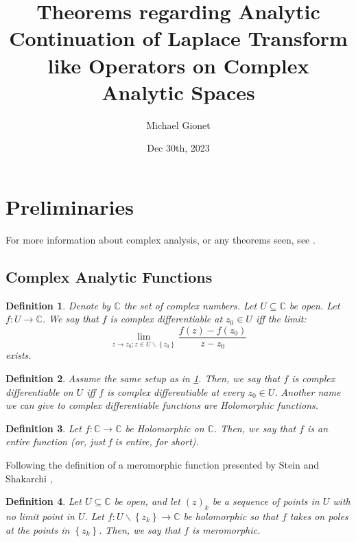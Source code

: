 \documentclass{article}
\title{Theorems regarding Analytic Continuation of Laplace Transform like Operators on Complex Analytic Spaces}
\author{Michael Gionet}
\date{Dec 30th, 2023}
\newtheorem{definition}{Definition}
\begin{document}
	\maketitle
	
	\section{Preliminaries}
	
	For more information about complex analysis, or any theorems seen, see \cite{steinComplexAnalysis}.
	
	\subsection{Complex Analytic Functions}
	
	\begin{definition} \label{def_complex_diff_point}
		Denote by $\mathbb{C}$ the set of complex numbers. 
		Let $ U \subseteq \mathbb{C} $ be open. 
		Let $ f : U \rightarrow \mathbb{C} $. 
		We say that $f$ is complex differentiable at $z_0 \in U$ iff the limit:
		$$ \lim_{ z \rightarrow z_0; z \in U \backslash \left\{ z_0 \right\} } \frac{ f(z) - f(z_0) }{ z - z_0 } $$
		exists. 
	\end{definition}

	\begin{definition} \label{ def_complex_diff_domain }
		Assume the same setup as in \ref{def_complex_diff_point}. Then, we say that $f$ is complex differentiable on $U$ iff $f$ is complex differentiable at every $z_0 \in U$. Another name we can give to complex differentiable functions are Holomorphic functions. 
	\end{definition}

	\begin{definition} \label{ def_entire_function }
		Let $f : \mathbb{C} \rightarrow \mathbb{C}$ be Holomorphic on $\mathbb{C}$. Then, we say that $f$ is an entire function (or, just f is entire, for short).
	\end{definition}

	Following the definition of a meromorphic function presented by Stein and Shakarchi \cite{steinComplexAnalysis},
	\begin{definition} \label{ def_meromorphic }
		Let $U \subseteq \mathbb{C}$ be open, and let $(z)_k$ be a sequence of points in $U$ with no limit point in $U$. 
		Let $f : U \backslash \left\{z_k \right\} \rightarrow \mathbb{C} $ be holomorphic so that $f$ takes on poles at the points in $\left\{ z_k \right\}$. Then, we say that $f$ is meromorphic.
	\end{definition}
\end{document}
